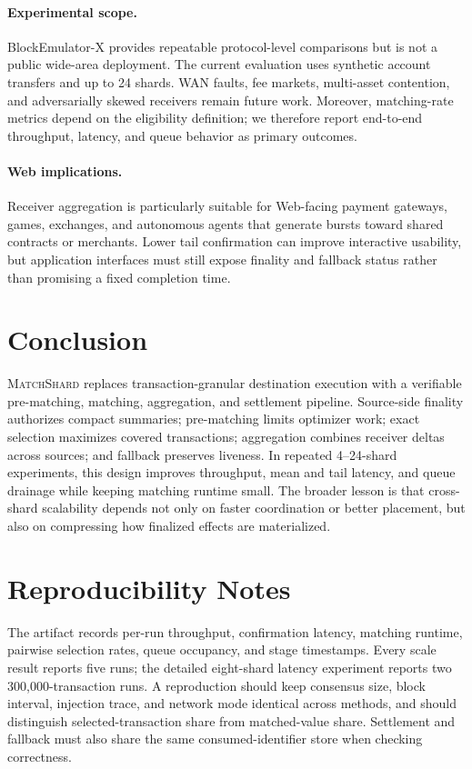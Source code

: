 \documentclass[sigconf,anonymous,review]{acmart}
\newcommand{\system}{\textsc{MatchShard}\xspace}
\begin{document}
\paragraph{Experimental scope.}
BlockEmulator-X provides repeatable protocol-level comparisons but is not a public wide-area deployment. The current evaluation uses synthetic account transfers and up to 24 shards. WAN faults, fee markets, multi-asset contention, and adversarially skewed receivers remain future work. Moreover, matching-rate metrics depend on the eligibility definition; we therefore report end-to-end throughput, latency, and queue behavior as primary outcomes.

\paragraph{Web implications.}
Receiver aggregation is particularly suitable for Web-facing payment gateways, games, exchanges, and autonomous agents that generate bursts toward shared contracts or merchants. Lower tail confirmation can improve interactive usability, but application interfaces must still expose finality and fallback status rather than promising a fixed completion time.

\section{Conclusion}

\system replaces transaction-granular destination execution with a verifiable pre-matching, matching, aggregation, and settlement pipeline. Source-side finality authorizes compact summaries; pre-matching limits optimizer work; exact selection maximizes covered transactions; aggregation combines receiver deltas across sources; and fallback preserves liveness. In repeated 4--24-shard experiments, this design improves throughput, mean and tail latency, and queue drainage while keeping matching runtime small. The broader lesson is that cross-shard scalability depends not only on faster coordination or better placement, but also on compressing how finalized effects are materialized.




\appendix
\section{Reproducibility Notes}

The artifact records per-run throughput, confirmation latency, matching runtime, pairwise selection rates, queue occupancy, and stage timestamps. Every scale result reports five runs; the detailed eight-shard latency experiment reports two 300,000-transaction runs. A reproduction should keep consensus size, block interval, injection trace, and network mode identical across methods, and should distinguish selected-transaction share from matched-value share. Settlement and fallback must also share the same consumed-identifier store when checking correctness.
\end{document}

